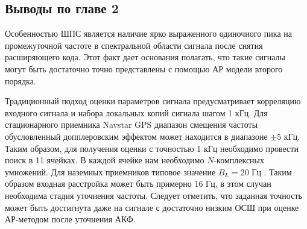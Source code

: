 \subsection*{Выводы по главе 2}

Особенностью ШПС является наличие ярко выраженного одиночного пика на промежуточной частоте в спектральной области сигнала после снятия расширяющего кода.
Этот факт дает основания полагать, что такие сигналы могут быть достаточно точно представлены с помощью АР модели второго порядка.

Традиционный подход оценки параметров сигнала предусматривает корреляцию входного сигнала и набора локальных копий сигнала шагом 1 кГц.
Для стационарного приемника Navstar GPS диапазон смещения частоты обусловленный допплеровским эффектом \cite{tsui} может находится в
диапазоне ${\pm 5}$ кГц. Таким образом, для получения оценки с точностью 1 кГц необходимо провести поиск в 11 ячейках.
В каждой ячейке нам необходимо ${N}$-комплексных умножений. Для наземных приемников типовое значение  ${B_L=20}$ Гц
\cite{tsui, akos-book}. Таким образом входная расстройка может быть примерно 16 Гц, в этом случан необходима стадия уточнения частоты.
Следует отметить, что заданная точность может быть достигнута даже на сигнале с достаточно низким ОСШ при оценке АР-методом после
уточнения АКФ.

\newpage
